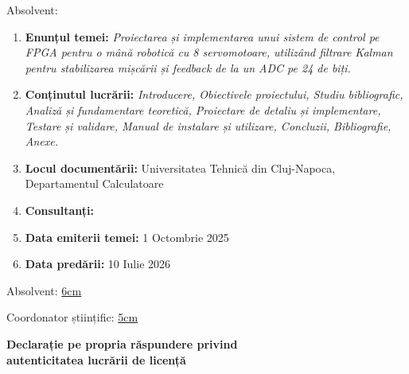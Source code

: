 \vspace{2cm}

\begin{center}
	Absolvent: {\bf \thesisauthor}

	\vspace{1cm}

	{\bf \thesistitle}
\end{center}

\vspace{5mm}

\begin{enumerate}
	\item {\bf Enunțul temei:} {\it Proiectarea și implementarea unui sistem de control pe FPGA pentru o mână robotică cu 8 servomotoare, utilizând filtrare Kalman pentru stabilizarea mișcării și feedback de la un ADC pe 24 de biți.}
	\item {\bf Conținutul lucrării:} {\it Introducere, Obiectivele proiectului, Studiu bibliografic, Analiză și fundamentare teoretică, Proiectare de detaliu și implementare, Testare și validare, Manual de instalare și utilizare, Concluzii, Bibliografie, Anexe.}
	\item {\bf Locul documentării:} Universitatea Tehnică din Cluj-Napoca, Departamentul Calculatoare
	\item {\bf Consultanți:}
	\item {\bf Data emiterii temei:} 1 Octombrie 2025
	\item {\bf Data predării:} 10 Iulie 2026
\end{enumerate}
\vspace{1.2cm}

\hspace{6cm} Absolvent: \uline{6cm}

\vspace{0.5cm}
\hspace{6cm} Coordonator științific: \uline{5cm}
\newpage

\begin{center}
	{\department}
\end{center}
\vspace{0.5cm}

\begin{center}
	{\bf Declarație pe propria răspundere privind\\
		autenticitatea lucrării de licență}
\end{center}
\vspace{1cm}

